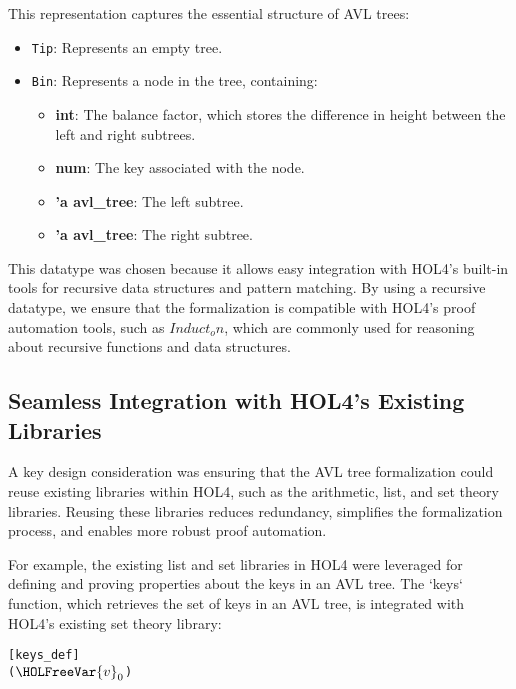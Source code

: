 This representation captures the essential structure of AVL trees:
\begin{itemize}
    \item \texttt{Tip}: Represents an empty tree.
    \item \texttt{Bin}: Represents a node in the tree, containing:
        \begin{itemize}
            \item \textbf{int}: The balance factor, which stores the difference in height between the left and right subtrees.
            \item \textbf{num}: The key associated with the node.
            \item \textbf{'a avl\_tree}: The left subtree.
            \item \textbf{'a avl\_tree}: The right subtree.
        \end{itemize}
\end{itemize}

This datatype was chosen because it allows easy integration with HOL4’s built-in tools for recursive data structures and pattern matching. By using a recursive datatype, we ensure that the formalization is compatible with HOL4's proof automation tools, such as  \( Induct_on \), which are commonly used for reasoning about recursive functions and data structures.

\subsection{Seamless Integration with HOL4’s Existing Libraries}

A key design consideration was ensuring that the AVL tree formalization could reuse existing libraries within HOL4, such as the arithmetic, list, and set theory libraries. Reusing these libraries reduces redundancy, simplifies the formalization process, and enables more robust proof automation.

For example, the existing list and set libraries in HOL4 were leveraged for defining and proving properties about the keys in an AVL tree. The `keys` function, which retrieves the set of keys in an AVL tree, is integrated with HOL4’s existing set theory library:

\begin{alltt}
	[keys_def]
	  \HOLTokenDefEquality{} \HOLSymConst{\HOLTokenEmpty{}}
 ( \ensuremath{\HOLFreeVar{v}\sb{\mathrm{0}}}    ) \HOLTokenDefEquality{} \HOLTokenLeftbrace{}\HOLTokenRightbrace{} \HOLSymConst{\HOLTokenUnion{}}   \HOLSymConst{\HOLTokenUnion{}}  
\end{alltt}


